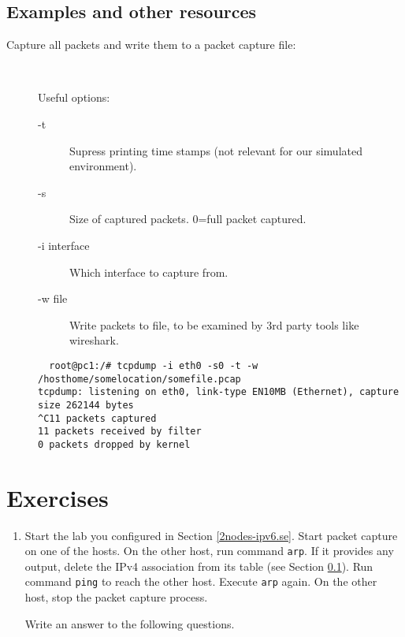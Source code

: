 \documentclass[12pt]{book}
\begin{document}
\subsection{Examples and other resources}\label{examples.lab1}

\begin{description}
\item[Capture all packets and write them to a packet capture file:] ~

  Useful options:
  \begin{description}
    \item [-t] Supress printing time stamps (not relevant for our
      simulated environment).
    \item [-s] Size of captured packets. 0=full packet captured.
    \item [-i interface] Which interface to capture from.
    \item [-w file] Write packets to file, to be examined by 3rd party
      tools like wireshark.
  \end{description}
  
  {\small
\begin{verbatim}
  root@pc1:/# tcpdump -i eth0 -s0 -t -w /hosthome/somelocation/somefile.pcap
tcpdump: listening on eth0, link-type EN10MB (Ethernet), capture size 262144 bytes
^C11 packets captured
11 packets received by filter
0 packets dropped by kernel
\end{verbatim}
  }
  
\end{description}

\section{Exercises}

\begin{enumerate}[1.]
\item Start the lab you configured in Section
  \ref*{2nodes-ipv6.se}. Start packet capture on one of the hosts. On
  the other host, run command \verb$arp$. If it provides any output,
  delete the IPv4 association from its table (see Section
  \ref*{examples.lab1}). Run command \verb$ping$ to reach the other
  host. Execute \verb$arp$ again. On the other host, stop the packet
  capture process. 

  Write an answer to the following questions. 
\end{enumerate}

 
\end{document}
